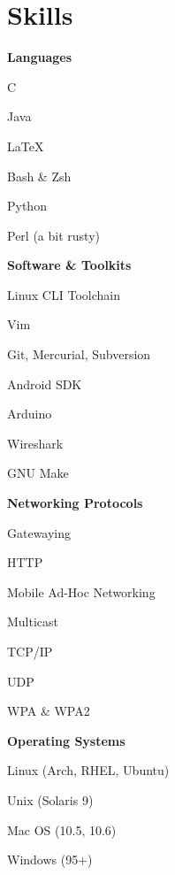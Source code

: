 \documentclass[10pt]{barag_resume}
\begin{document}
	\section{Skills}%
		\begin{minipage}[t]{\textwidth}
		\vspace{-1em} %
		\begin{multicols}{2}
			\textbf{Languages}
			\begin{csitemize}
				\item C
				\item Java
				\item \LaTeX
				\item Bash \& Zsh
				\item Python
				\item Perl (a bit rusty)\columnbreak
			\end{csitemize}

			\textbf{Software \& Toolkits}
			\begin{csitemize}
				\item Linux CLI Toolchain
				\item Vim
				\item Git, Mercurial, Subversion
				\item Android SDK
				\item Arduino
				\item Wireshark
				\item GNU Make
			\end{csitemize}
		\end{multicols}
		\begin{multicols}{2}
			\textbf{Networking Protocols}
			\begin{csitemize}
				\item Gatewaying
				\item HTTP
				\item Mobile Ad-Hoc Networking
				\item Multicast
				\item TCP/IP
				\item UDP
				\item WPA \& WPA2\columnbreak
			\end{csitemize}

			\textbf{Operating Systems}
			\begin{csitemize}
				\item Linux (Arch, RHEL, Ubuntu)
				\item Unix (Solaris 9)
				\item Mac OS (10.5, 10.6)
				\item Windows (95+)
			\end{csitemize}
		\end{multicols}
		\end{minipage}
\end{document}
